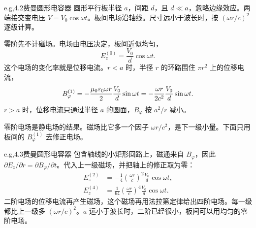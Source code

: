 \begin{frame}{e.g,4.2费曼圆形电容器}
圆形平行板半径 $a$，间距 $d$，且 $d\ll a$，忽略边缘效应。两端接交变电压 $V=V_0\cos\omega t$。板间电场沿轴线。尺寸远小于波长时，按 $(\omega r/c)^2$ 逐级计算。

零阶先不计磁场。电场由电压决定，板间近似均匀，
\[
 E_z^{(0)}=\frac{V_0}{d}\cos\omega t.
\]
这个电场的变化率就是位移电流。$r<a$ 时，半径 $r$ 的环路围住 $\pi r^2$ 上的位移电流，
\[
 B_\varphi^{(1)}
 =-\frac{\mu_0\varepsilon_0\omega r}{2}\frac{V_0}{d}\sin\omega t
 =-\frac{\omega r}{2c^2}\frac{V_0}{d}\sin\omega t.
\]
$r>a$ 时，位移电流只通过半径 $a$ 的圆面，$B_\varphi$ 按 $a^2/r$ 减小。

零阶电场是静电场的结果。磁场比它多一个因子 $\omega r/c^2$，是下一级小量。下面只用板间的 $B_\varphi^{(1)}$ 去修正电场。
\end{frame}

\begin{frame}{e.g,4.3费曼圆形电容器}
包含轴线的小矩形回路上，磁通来自 $B_\varphi$，因此 $\partial E_z/\partial r=\partial B_\varphi/\partial t$。代入上一级磁场，并把轴上的修正取为零：
\[
 \begin{aligned}
 E_z^{(2)}
 &=-\frac14\left(\frac{\omega r}{c}\right)^2\frac{V_0}{d}\cos\omega t,\\
 E_z^{(4)}
 &=\frac{1}{64}\left(\frac{\omega r}{c}\right)^4\frac{V_0}{d}\cos\omega t.
 \end{aligned}
\]
二阶电场的位移电流再产生磁场，这个磁场再用法拉第定律给出四阶电场。每一级都比上一级多 $(\omega r/c)^2$。$a$ 远小于波长时，二阶已经很小，板间可以用均匀的零阶电场。

\end{frame}

